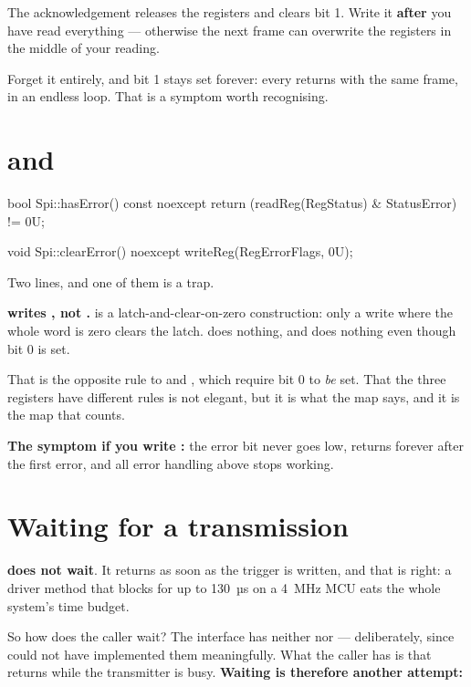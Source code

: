 The acknowledgement releases the  registers and clears  bit 1. Write it
\textbf{after} you have read everything --- otherwise the next frame can overwrite the registers
in the middle of your reading.

Forget it entirely, and bit 1 stays set forever: every  returns  with
the same frame, in an endless loop. That is a symptom worth recognising.

\section{\texorpdfstring{}{hasError()} and \texorpdfstring{}{clearError()}}
\label{sec:errors}

\begin{cppcode}
bool Spi::hasError() const noexcept
{
    return (readReg(RegStatus) & StatusError) != 0U;
}

void Spi::clearError() noexcept
{
    writeReg(RegErrorFlags, 0U);
}
\end{cppcode}

Two lines, and one of them is a trap.

\textbf{ writes , not .}  is a
latch-and-clear-on-zero construction: only a write where the whole word is zero clears the latch.
 does nothing, and  does nothing even though bit 0 is set.

That is the opposite rule to  and , which require bit 0 to \emph{be}
set. That the three registers have different rules is not elegant, but it is what the map says,
and it is the map that counts.

\textbf{The symptom if you write :} the error bit never goes low, 
returns  forever after the first error, and all error handling above stops working.

\section{Waiting for a transmission}
\label{sec:waiting}

 \textbf{does not wait}. It returns as soon as the trigger is written, and that is
right: a driver method that blocks for up to 130~µs on a 4~MHz MCU eats the whole system's time
budget.

So how does the caller wait? The interface has neither  nor 
--- deliberately, since  could not have implemented them meaningfully. What the caller
has is that  returns  while the transmitter is busy. \textbf{Waiting is
therefore another attempt:}

